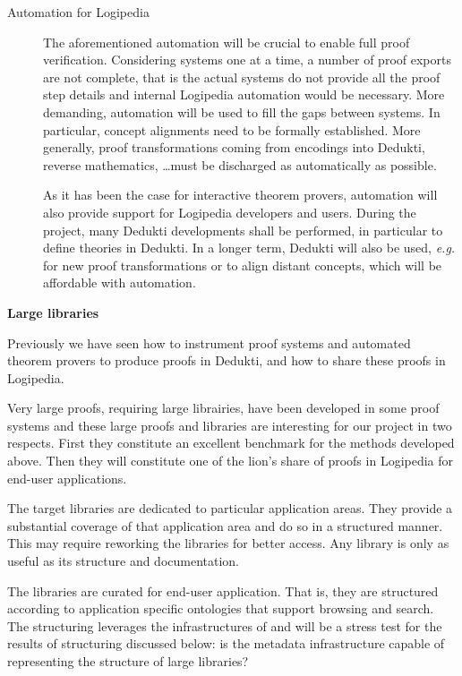 \begin{description}
\item[Automation for Logipedia]

  The aforementioned automation will be crucial to enable full proof
  verification. Considering systems one at a time, a number of proof
  exports are not complete, that is the actual systems do not provide
  all the proof step details and internal Logipedia automation would
  be necessary. More demanding, automation will be used to fill the
  gaps between systems. In particular, concept alignments need to be
  formally established. More generally, proof transformations coming
  from encodings into Dedukti, reverse mathematics, \dots must be
  discharged as automatically as possible.

  As it has been the case for interactive theorem provers, automation
  will also provide support for Logipedia developers and users. During
  the project, many Dedukti developments shall be performed, in
  particular to define theories in Dedukti. In a longer term, Dedukti
  will also be used, {\em e.g.} for new proof transformations or to
  align distant concepts, which will be affordable with automation.
\end{description}

\bigskip

\noindent
{\bf \Large Large libraries}

\medskip

Previously we have seen how to instrument proof systems and automated
theorem provers to produce proofs in Dedukti, and how to share these
proofs in Logipedia.

Very large proofs, requiring large librairies, have been developed in
some proof systems and these large proofs and libraries are
interesting for our project in two respects. First they constitute an
excellent benchmark for the methods developed above. Then they will
constitute one of the lion's share of proofs in Logipedia for end-user
applications.

The target libraries are dedicated to particular application
areas. They provide a substantial coverage of that application area
and do so in a structured manner. This may require reworking the
libraries for better access. Any library is only as useful as its structure and documentation.

The libraries are curated for end-user application. That is, they
are structured according to application specific ontologies that
support browsing and search. The structuring leverages the
infrastructures of and will be a
stress test for the results of structuring discussed below: is the metadata
infrastructure capable of representing the structure of large
libraries?

